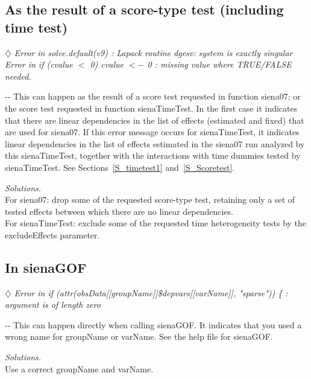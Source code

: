 \documentclass[a4paper,fleqn,11pt]{article}
\makeatletter
\newcommand{\+}{\, + \,}
\newcommand{\sfn}[1]{\textsf{#1}}
\newenvironment{indentation}[2]
{\par \setlength{\leftmargin}{#1}       \setlength{\rightmargin}{#2}
  \advance\linewidth -\leftmargin       \advance\linewidth -\rightmargin
  \advance\@totalleftmargin\leftmargin  \@setpar{{\@@par}}%
  \parshape 1 \@totalleftmargin         \linewidth \ignorespaces}{\par}
\makeatother
\begin{document}
\subsection{As the result of a score-type test (including time test)}

$\diamondsuit$
\emph{Error in solve.default(v9) :
   Lapack routine dgesv: system is exactly singular\\
Error in if (cvalue $<$ 0) cvalue $<-$ 0 :
   missing value where TRUE/FALSE needed.}
\smallskip

\begin{indentation}{0.04\textwidth}{0pt}
\noindent
This can happen as the result of a score test requested in function
\sfn{siena07}; or the score test requested in function
\sfn{sienaTimeTest}.
In the first case it indicates that there are linear dependencies in the
list of effects (estimated and fixed)
that are used for \sfn{siena07}.
If this error message occurs for \sfn{sienaTimeTest}, it indicates
linear dependencies in the list of effects estimated
in the \sfn{siena07} run analyzed by this \sfn{sienaTimeTest},
together with the interactions with time dummies tested by
\sfn{sienaTimeTest}.
See Sections~\ref{S_timetest1} and~\ref{S_Scoretest}.
\smallskip

\noindent
\emph{Solutions.} \\
For \sfn{siena07}: drop some of the requested score-type test,
retaining only a set of tested effects between which there are no
linear dependencies.\\
For \sfn{sienaTimeTest}: exclude some of the requested
time heterogeneity tests by the \sfn{excludeEffects} parameter.
\end{indentation}

\subsection{In sienaGOF}

$\diamondsuit$
\emph{Error in if (attr(obsData[[groupName]]\$depvars[[varName]], "sparse")) \{ :\\
  argument is of length zero }
\smallskip

\begin{indentation}{0.04\textwidth}{0pt}
\noindent
This can happen directly when calling \sfn{sienaGOF}.
It indicates that you used a wrong name for \sfn{groupName} or \sfn{varName}.
See the help file for \sfn{sienaGOF}.
\smallskip

\noindent
\emph{Solutions.} \\
Use a correct \sfn{groupName} and \sfn{varName}.
\end{indentation}
\bigskip
\end{document}
